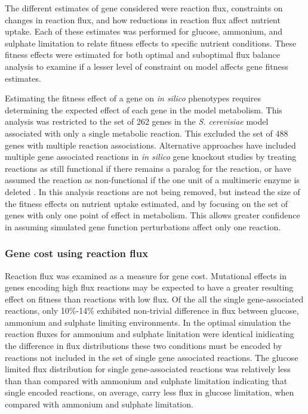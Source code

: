 The different estimates of gene considered were reaction flux, constraints on changes in reaction flux, and how reductions in reaction flux affect nutrient uptake. Each of these estimates was performed for glucose, ammonium, and sulphate limitation to relate fitness effects to specific nutrient conditions. These fitness effects were estimated for both optimal and suboptimal flux balance analysis to examine if a lesser level of constraint on model affects gene fitness estimates.

Estimating the fitness effect of a gene on \emph{in silico} phenotypes requires determining the expected effect of each gene in the model metabolism. This analysis was restricted to the set of 262 genes in the \emph{S. cerevisiae} model associated with only a single metabolic reaction. This excluded the set of 488 genes with multiple reaction associations. Alternative approaches have included multiple gene associated reactions in \emph{in silico} gene knockout studies by treating reactions as still functional if there remains a paralog for the reaction, or have assumed the reaction as non-functional if the one unit of a multimeric enzyme is deleted \cite{pal2006}. In this analysis reactions are not being removed, but instead the size of the fitness effects on nutrient uptake estimated, and by focusing on the set of genes with only one point of effect in metabolism. This allows greater confidence in assuming simulated gene function perturbations affect only one reaction.

\subsubsection{Gene cost using reaction flux}%

Reaction flux was examined as a measure for gene cost. Mutational effects in genes encoding high flux reactions may be expected to have a greater resulting effect on fitness than reactions with low flux. Of the all the single gene-associated reactions, only 10\%-14\% exhibited non-trivial difference in flux between glucose, ammonium and sulphate limiting environments. In the optimal simulation the reaction fluxes for ammonium and sulphate linitation were identical inidicating the difference in flux distributions these two conditions must be encoded by reactions not included in the set of single gene associated reactions. The glucose limited flux distribution for single gene-associated reactions was relatively less than than compared with ammonium and sulphate limitation indicating that single encoded reactions, on average, carry less flux in glucose limitation, when compared with ammonium and sulphate limitation.

